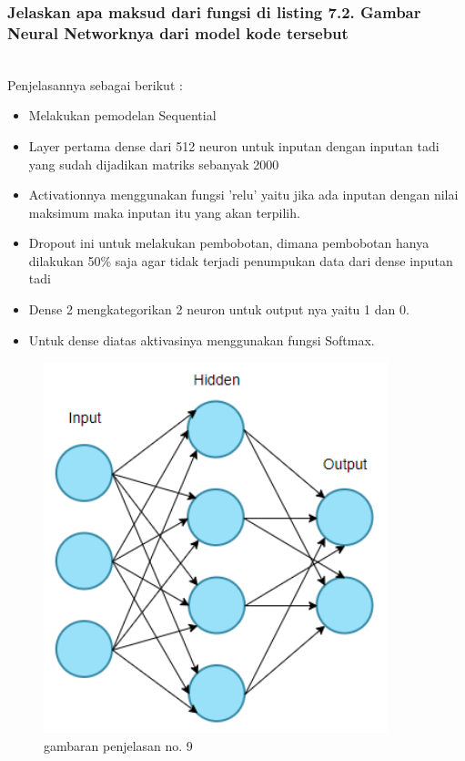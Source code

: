 \subsubsection{Jelaskan apa maksud dari fungsi di listing 7.2. Gambar Neural Networknya dari model kode tersebut}
\hfill\\

Penjelasannya sebagai berikut :
\begin{itemize}
\item Melakukan pemodelan Sequential
\item Layer pertama dense dari 512 neuron untuk inputan dengan inputan tadi yang sudah dijadikan matriks sebanyak 2000
\item Activationnya menggunakan fungsi 'relu' yaitu jika ada inputan dengan nilai maksimum maka inputan itu yang akan terpilih.
\item Dropout ini untuk melakukan pembobotan, dimana pembobotan hanya dilakukan 50\% saja agar tidak terjadi penumpukan data dari dense inputan tadi
\item Dense 2 mengkategorikan 2 neuron untuk output nya yaitu 1 dan 0.
\item Untuk dense diatas aktivasinya menggunakan fungsi Softmax.
\end{itemize}

\begin{figure}[H]
	\centering
	\includegraphics[width=10cm]{figures/1174083/figures7/8.png}
	\caption{gambaran penjelasan no. 9}
\end{figure}

